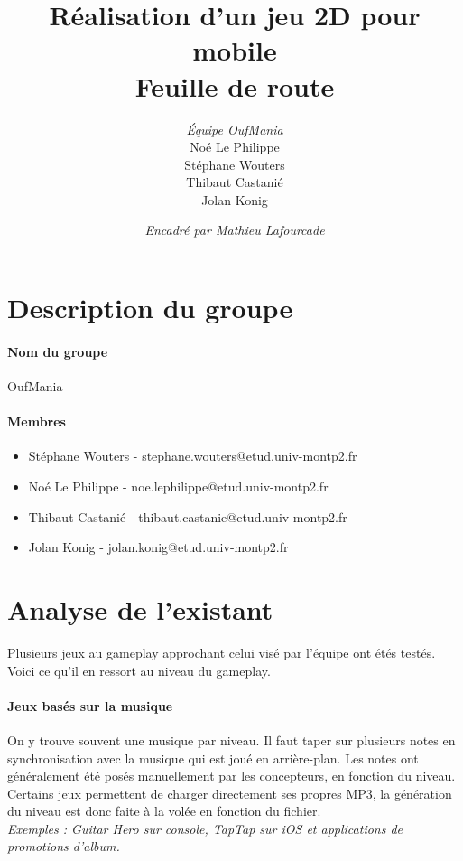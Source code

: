 \documentclass[a4paper,11pt]{article}
\begin{document}
\title{\textbf{Réalisation d'un jeu 2D pour mobile}\\Feuille de route}
\author{\textit{Équipe OufMania}\\Noé Le Philippe\\Stéphane Wouters\\Thibaut Castanié\\Jolan Konig}
\date{\textit{Encadré par Mathieu Lafourcade}}

\maketitle
\thispagestyle{empty}

\newpage 

\tableofcontents

\newpage 

\section{Description du groupe}
\paragraph{Nom du groupe}
OufMania
\paragraph{Membres}
\begin{itemize}
\item Stéphane Wouters - stephane.wouters@etud.univ-montp2.fr
\item Noé Le Philippe - noe.lephilippe@etud.univ-montp2.fr
\item Thibaut Castanié - thibaut.castanie@etud.univ-montp2.fr
\item Jolan Konig - jolan.konig@etud.univ-montp2.fr
\end{itemize}
\section{Analyse de l'existant}
Plusieurs jeux au gameplay approchant celui visé par l’équipe ont étés testés. Voici ce qu’il en ressort au niveau du gameplay.
\paragraph{Jeux basés sur la musique}
On y trouve souvent une musique par niveau. Il faut taper sur plusieurs notes en synchronisation avec la musique qui est joué en arrière-plan. Les notes ont généralement été posés manuellement par les concepteurs, en fonction du niveau. Certains jeux permettent de charger directement ses propres MP3, la génération du niveau est donc faite à la volée en fonction du fichier.\\
\textit{Exemples : Guitar Hero sur console, TapTap sur iOS et applications de promotions d’album.}
\end{document}
